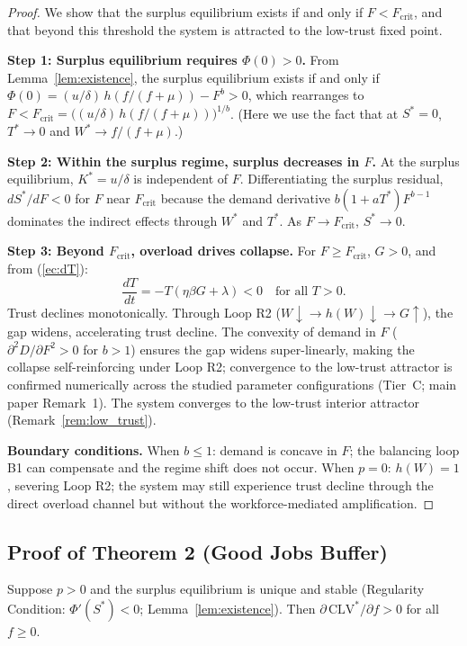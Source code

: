 \documentclass[msom,dblanonrev]{informs4}
\begin{document}
\begin{proof}
We show that the surplus equilibrium exists if and only if $F < F_{\mathrm{crit}}$, and that beyond this threshold the system is attracted to the low-trust fixed point.

\textbf{Step 1: Surplus equilibrium requires $\Phi(0) > 0$.} From Lemma~\ref{lem:existence}, the surplus equilibrium exists if and only if $\Phi(0) = (u/\delta)\,h(f/(f+\mu)) - F^b > 0$, which rearranges to $F < F_{\mathrm{crit}} = \bigl((u/\delta)\,h(f/(f+\mu))\bigr)^{1/b}$. (Here we use the fact that at $S^* = 0$, $T^* \to 0$ and $W^* \to f/(f+\mu)$.)

\textbf{Step 2: Within the surplus regime, surplus decreases in $F$.} At the surplus equilibrium, $K^* = u/\delta$ is independent of $F$. Differentiating the surplus residual, $dS^*/dF < 0$ for $F$ near $F_{\mathrm{crit}}$ because the demand derivative $b(1+aT^*)F^{b-1}$ dominates the indirect effects through $W^*$ and $T^*$. As $F \to F_{\mathrm{crit}}$, $S^* \to 0$.

\textbf{Step 3: Beyond $F_{\mathrm{crit}}$, overload drives collapse.} For $F \geq F_{\mathrm{crit}}$, $G > 0$, and from (\ref{ec:dT}):
\[
\frac{dT}{dt} = -T(\eta\beta G + \lambda) < 0 \quad \text{for all } T > 0.
\]
Trust declines monotonically. Through Loop R2 ($W\!\downarrow \to h(W)\!\downarrow \to G\!\uparrow$), the gap widens, accelerating trust decline. The convexity of demand in $F$ ($\partial^2 D/\partial F^2 > 0$ for $b > 1$) ensures the gap widens super-linearly, making the collapse self-reinforcing under Loop R2; convergence to the low-trust attractor is confirmed numerically across the studied parameter configurations (Tier~C; main paper Remark~1). The system converges to the low-trust interior attractor (Remark~\ref{rem:low_trust}).

\textbf{Boundary conditions.} When $b \leq 1$: demand is concave in $F$; the balancing loop B1 can compensate and the regime shift does not occur. When $p = 0$: $h(W) = 1$, severing Loop R2; the system may still experience trust decline through the direct overload channel but without the workforce-mediated amplification.
\end{proof}


\subsection{Proof of Theorem 2 (Good Jobs Buffer)}\label{sec:ec:proof2}

\begin{theorem}
Suppose $p > 0$ and the surplus equilibrium is unique and stable (Regularity Condition: $\Phi'(S^*) < 0$; Lemma~\ref{lem:existence}). Then $\partial\,\mathrm{CLV}^*/\partial f > 0$ for all $f \geq 0$.
\end{theorem}
\end{document}
